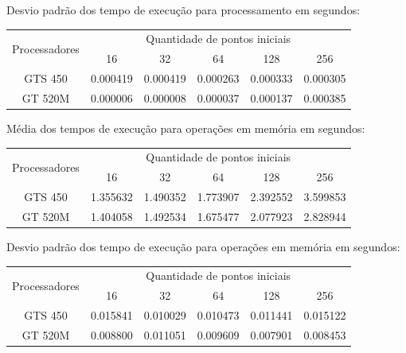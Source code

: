     \hspace{1mm}\newline
    
    \noindent Desvio padrão dos tempo de execução para processamento em segundos:\\
    \begin{tabular}{| c | c | c | c | c | c |}
      \hline
      \multirow{2}{*}{Processadores}& \multicolumn{5}{|c|}{Quantidade de pontos iniciais} \\ \cline{2-6}
      & 16 & 32 & 64 & 128 & 256 \\ \hline
      GTS 450 & 0.000419 & 0.000419 & 0.000263 & 0.000333 & 0.000305 \\ \hline
      GT 520M & 0.000006 & 0.000008 & 0.000037 & 0.000137 & 0.000385 \\ \hline

      \hline
    \end{tabular}
    
    \hspace{1mm}\newline
    
    \noindent Média dos tempos de execução para operações em memória em segundos:\\
    \begin{tabular}{| c | c | c | c | c | c |}
      \hline
      \multirow{2}{*}{Processadores}& \multicolumn{5}{|c|}{Quantidade de pontos iniciais} \\ \cline{2-6}
      & 16 & 32 & 64 & 128 & 256 \\ \hline
      GTS 450 & 1.355632 & 1.490352 & 1.773907 & 2.392552 & 3.599853\\ \hline
      GT 520M & 1.404058 & 1.492534 & 1.675477 & 2.077923 & 2.828944\\ \hline

      \hline
    \end{tabular}
    
    \hspace{1mm}\newline
    
    \noindent Desvio padrão dos tempo de execução para operações em memória em segundos:\\
    \begin{tabular}{| c | c | c | c | c | c |}
      \hline
      \multirow{2}{*}{Processadores}& \multicolumn{5}{|c|}{Quantidade de pontos iniciais} \\ \cline{2-6}
      & 16 & 32 & 64 & 128 & 256 \\ \hline
      GTS 450 & 0.015841 & 0.010029 & 0.010473 & 0.011441 & 0.015122 \\ \hline
      GT 520M & 0.008800 & 0.011051 & 0.009609 & 0.007901 & 0.008453 \\ \hline

      \hline
    \end{tabular}
    

